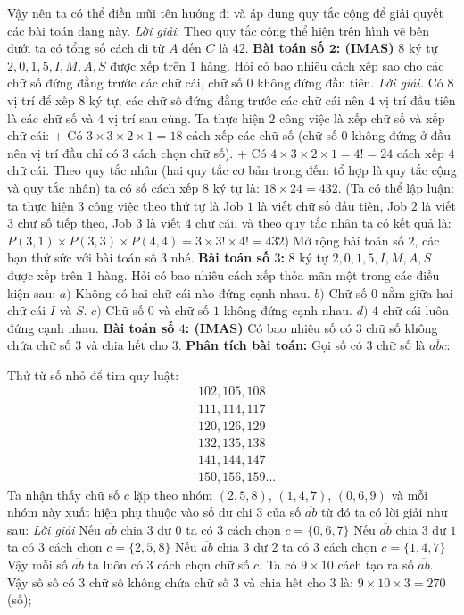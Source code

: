 	\vskip 0.1cm
	Vậy nên ta có thể điền mũi tên hướng đi và áp dụng quy tắc cộng để giải quyết các bài toán dạng này.
	\vskip 0.1cm
	\textit{Lời giải}: Theo quy tắc cộng thể hiện trên hình vẽ bên dưới ta có tổng số cách đi từ $A$ đến $C$ là $42$.
	\vskip 0.1cm
\textbf{\color{toancuabi}Bài toán số $\pmb2$: (IMAS)}
\vskip 0.1cm
$8$ ký tự $2,0,1,5,I,M,A,S$ được xếp trên $1$ hàng. Hỏi có bao nhiêu cách xếp sao cho các chữ số đứng đằng trước các chữ cái, chữ số $0$ không đứng đầu tiên.
\vskip 0.1cm
\textit{Lời giải.}
Có $8$ vị trí để xếp $8$ ký tự, các chữ số đứng đằng trước các chữ cái nên $4$ vị trí đầu tiên là các chữ số và $4$ vị trí sau cùng. Ta thực hiện $2$ công việc là xếp chữ số và xếp chữ cái:
\vskip 0.1cm
+ Có $3\times3\times2\times1=18$ cách xếp các chữ số (chữ số $0$ không đứng ở đầu nên vị trí đầu chỉ có $3$ cách chọn chữ số).
\vskip 0.1cm
+ Có $4\times3\times2\times1=4!=24$ cách xếp $4$ chữ cái.
\vskip 0.1cm
Theo quy tắc nhân (hai quy tắc cơ bản trong đếm tổ hợp là quy tắc cộng và quy tắc nhân) ta có số cách xếp $8$ ký tự là: $18\times24=432$.
\vskip 0.1cm
(Ta có thể lập luận: ta thực hiện $3$ công việc theo thứ tự là Job $1$ là viết chữ số đầu tiên, Job $2$ là viết $3$ chữ số tiếp theo, Job $3$ là viết $4$ chữ cái, và theo quy tắc nhân ta có kết quả là: $P(3,1)\times P(3,3)\times P(4,4)=3\times3!\times4!=432$)
\vskip 0.1cm
Mở rộng bài toán số $2$, các bạn thử sức với bài toán số $3$ nhé.
\vskip 0.1cm
\textbf{\color{toancuabi}Bài toán số $3$:}
\vskip 0.1cm
$8$ ký tự $2,0,1,5,I,M,A,S$ được xếp trên $1$ hàng. Hỏi có bao nhiêu cách xếp thỏa mãn một trong các điều kiện sau:
\vskip 0.1cm
$a)$ Không có hai chữ cái nào đứng cạnh nhau.
\vskip 0.1cm
$b)$ Chữ số $0$ nằm giữa hai chữ cái $I$ và $S$.
\vskip 0.1cm
$c)$ Chữ số $0$ và chữ số $1$ không đứng cạnh nhau.
\vskip 0.1cm
$d)$ $4$ chữ cái luôn đứng cạnh nhau.
\vskip 0.1cm
\textbf{\color{toancuabi}Bài toán số $4$: (IMAS)}
\vskip 0.1cm
Có bao nhiêu số có $3$ chữ số không chứa chữ số $3$ và chia hết cho $3$.
\vskip 0.1cm
\textbf{\color{toancuabi}Phân tích bài toán:}
\vskip 0.1cm
Gọi số có $3$ chữ số là $\overline{abc}$:
\begin{multicols}{2}
	Thử từ số nhỏ để tìm quy luật:
	\begin{align*}
		&102, 105, 108\\
		&111, 114, 117\\
		&120, 126, 129\\
		&132, 135, 138\\
		&141, 144, 147\\
		&150, 156, 159...
	\end{align*}
	Ta nhận thấy chữ số $c$ lặp theo nhóm $(2,5,8)$, $(1,4,7)$, $(0,6,9)$ và mỗi nhóm này xuất hiện phụ thuộc vào số dư chi $3$ của số $\overline{ab}$ từ đó ta có lời giải như sau:
\vskip 0.1cm
\textit{Lời giải}
\vskip 0.1cm
Nếu $\overline{ab}$ chia $3$ dư $0$ ta có $3$ cách chọn $c=\{0,6,7\}$
\vskip 0.1cm
Nếu $\overline{ab}$ chia $3$ dư $1$ ta có $3$ cách chọn $c=\{2,5,8\}$
\vskip 0.1cm
Nếu $\overline{ab}$ chia $3$ dư $2$ ta có $3$ cách chọn $c=\{1,4,7\}$
\vskip 0.1cm
Vậy mỗi số $\overline{ab}$ ta luôn có $3$ cách chọn chữ số $c$.
\vskip 0.1cm
Ta có $9\times 10$ cách tạo ra số $\overline{ab}$.
\vskip 0.1cm
Vậy số số có $3$ chữ số không chứa chữ số $3$ và chia hết cho $3$ là: $9\times10\times3=270$ (số);
\end{multicols}
